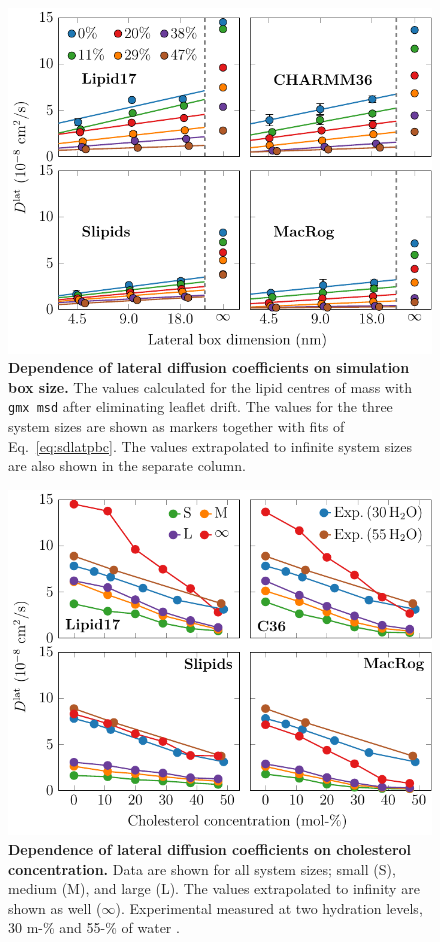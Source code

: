 \documentclass[journal=jpcbfk]{achemso}
\begin{document}
\begin{figure}[htb!]
    \centering
    \includegraphics[width=0.9\linewidth]{../FIGS/d_vs_size.pdf}
    \caption{\label{SIfig:dvssize}%
    \textbf{Dependence of lateral diffusion coefficients on simulation box size.} The values calculated for the lipid centres of mass with \texttt{gmx msd} after eliminating leaflet drift. The values for the three system sizes are shown as markers together with fits of Eq.~\eqref{eq:sdlatpbc}. The values extrapolated to infinite system sizes are also shown in the separate column. 
    }
\end{figure}

\begin{figure}[htb!]
    \centering
    \includegraphics[width=0.9\linewidth]{../FIGS/d_vs_chol.pdf}
    \caption{\label{SIfig:dvschol}%
     \textbf{Dependence of lateral diffusion coefficients on cholesterol concentration.} Data are shown for all system sizes; small (S), medium (M), and large (L). The values extrapolated to infinity are shown as well ($\infty$). Experimental measured at two hydration levels, 30 m-\% and 55-\% of water \cite{filippov2003effect,filippov2003influence}.
    }
\end{figure}
\end{document}
